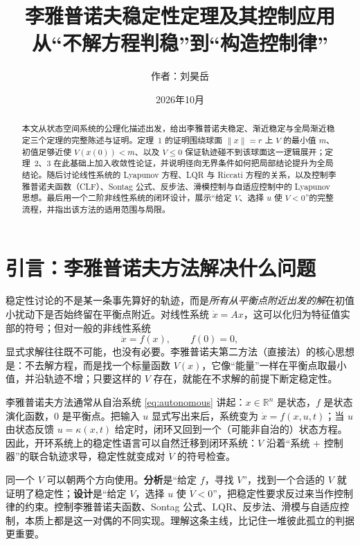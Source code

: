 \documentclass[11pt, a4paper, UTF8, fontset=none]{ctexart}
\title{\textbf{\LARGE 李雅普诺夫稳定性定理及其控制应用}\\[8pt]
\large 从“不解方程判稳”到“构造控制律”}
\author{作者：刘昊岳}
\date{2026年10月}
\theoremstyle{cnthm}
\newcommand{\R}{\mathbb{R}}
\newcommand{\norm}[1]{\lVert #1\rVert}
\begin{document}
\maketitle

\begin{abstract}
\noindent 本文从状态空间系统的公理化描述出发，给出李雅普诺夫稳定、渐近稳定与全局渐近稳定三个定理的完整陈述与证明。定理~1 的证明围绕球面 $\norm{x}=r$ 上 $V$ 的最小值 $m$、初值足够近使 $V(x(0))<m$、以及 $\dot V\le 0$ 保证轨迹碰不到该球面这一逻辑展开；定理~2、3 在此基础上加入收敛性论证，并说明径向无界条件如何把局部结论提升为全局结论。随后讨论线性系统的 Lyapunov 方程、LQR 与 Riccati 方程的关系，以及控制李雅普诺夫函数（CLF）、Sontag 公式、反步法、滑模控制与自适应控制中的 Lyapunov 思想。最后用一个二阶非线性系统的闭环设计，展示“给定 $V$、选择 $u$ 使 $\dot V<0$”的完整流程，并指出该方法的适用范围与局限。
\end{abstract}

\tableofcontents


\section{引言：李雅普诺夫方法解决什么问题}

稳定性讨论的不是某一条事先算好的轨迹，而是\emph{所有从平衡点附近出发的解}在初值小扰动下是否始终留在平衡点附近。对线性系统 $\dot x=Ax$，这可以化归为特征值实部的符号；但对一般的非线性系统
\begin{equation}
  \dot x=f(x),\qquad f(0)=0,
  \label{eq:autonomous}
\end{equation}
显式求解往往既不可能，也没有必要。李雅普诺夫第二方法（直接法）的核心思想是：不去解方程，而是找一个标量函数 $V(x)$，它像“能量”一样在平衡点取最小值，并沿轨迹不增；只要这样的 $V$ 存在，就能在不求解的前提下断定稳定性。

李雅普诺夫方法通常从自治系统 \eqref{eq:autonomous} 讲起：$x\in\R^n$ 是状态，$f$ 是状态演化函数，$0$ 是平衡点。把输入 $u$ 显式写出来后，系统变为 $\dot x=f(x,u,t)$；当 $u$ 由状态反馈 $u=\kappa(x,t)$ 给定时，闭环又回到一个（可能非自治的）状态方程。因此，开环系统上的稳定性语言可以自然迁移到闭环系统：$V$ 沿着“系统 + 控制器”的联合轨迹求导，稳定性就变成对 $\dot V$ 的符号检查。

同一个 $V$ 可以朝两个方向使用。\textbf{分析}是“给定 $f$，寻找 $V$”，找到一个合适的 $V$ 就证明了稳定性；\textbf{设计}是“给定 $V$，选择 $u$ 使 $\dot V<0$”，把稳定性要求反过来当作控制律的约束。控制李雅普诺夫函数、Sontag 公式、LQR、反步法、滑模与自适应控制，本质上都是这一对偶的不同实现。理解这条主线，比记住一堆彼此孤立的判据更重要。
\end{document}
